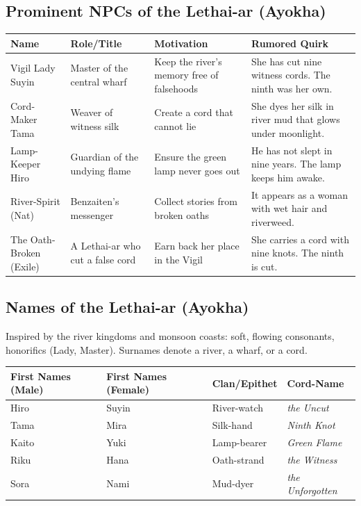 \subsection*{Prominent NPCs of the Lethai-ar (Ayokha)}
\label{sec:lethai-ar-npcs-revised}

\begin{longtable}{|p{}|p{}|p{}|p{}|}
\hline
\textbf{Name} & \textbf{Role/Title} & \textbf{Motivation} & \textbf{Rumored Quirk} \\
\hline
Vigil Lady Suyin & Master of the central wharf & Keep the river's memory free of falsehoods & She has cut nine witness cords. The ninth was her own. \\
\hline
Cord-Maker Tama & Weaver of witness silk & Create a cord that cannot lie & She dyes her silk in river mud that glows under moonlight. \\
\hline
Lamp-Keeper Hiro & Guardian of the undying flame & Ensure the green lamp never goes out & He has not slept in nine years. The lamp keeps him awake. \\
\hline
River-Spirit (Nat) & Benzaiten's messenger & Collect stories from broken oaths & It appears as a woman with wet hair and riverweed. \\
\hline
The Oath-Broken (Exile) & A Lethai-ar who cut a false cord & Earn back her place in the Vigil & She carries a cord with nine knots. The ninth is cut. \\
\hline
\end{longtable}

\subsection*{Names of the Lethai-ar (Ayokha)}
\label{sec:lethai-ar-names-revised}

Inspired by the river kingdoms and monsoon coasts: soft, flowing consonants, honorifics (Lady, Master). Surnames denote a river, a wharf, or a cord.

\begin{longtable}{|p{}|p{}|p{}|p{}|}
\hline
\textbf{First Names (Male)} & \textbf{First Names (Female)} & \textbf{Clan/Epithet} & \textbf{Cord-Name} \\
\hline
Hiro & Suyin & River-watch & \textit{the Uncut} \\
\hline
Tama & Mira & Silk-hand & \textit{Ninth Knot} \\
\hline
Kaito & Yuki & Lamp-bearer & \textit{Green Flame} \\
\hline
Riku & Hana & Oath-strand & \textit{the Witness} \\
\hline
Sora & Nami & Mud-dyer & \textit{the Unforgotten} \\
\hline
\end{longtable}

